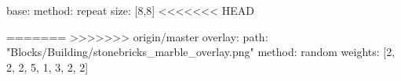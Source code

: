 base:
  method: repeat
  size: [8,8]
<<<<<<< HEAD

=======
>>>>>>> origin/master
overlay:
  path: "Blocks/Building/stonebricks_marble_overlay.png"
  method: random
  weights: [2, 2, 2, 5, 1, 3, 2, 2]
